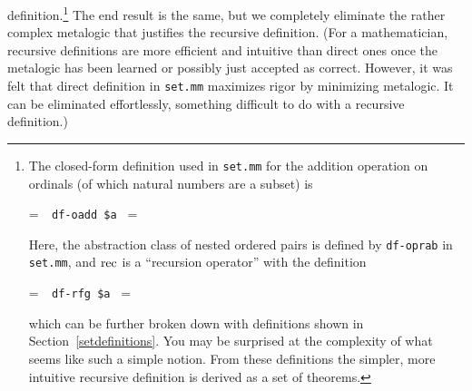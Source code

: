definition.\footnote{The closed-form definition used in \texttt{set.mm}
for the addition operation on ordinals (of which natural numbers are a
subset) is

\setbox\startprefix=\hbox{\tt \ \ df-oadd\ \$a\ }
\setbox\contprefix=\hbox{\tt \ \ \ \ \ \ \ \ \ \ \ \ \ }
\startm
\m{\vdash}\m{=}\m{\{}\m{\langle}\m{\langle}\m{,}\m{\rangle}%
\m{,}\m{\rangle}\m{|}\m{(}\m{(}\m{\in}\m{\wedge}\m{%
\in}\m{)}\m{\wedge}\m{=}\m{(}\m{(}\m{\{}\m{%
\langle}\m{,}\m{\rangle}\m{|}\m{=}\m{\}}\m{,}%
\m{)}\m{)}\m{)}\m{\}}
\endm

\noindent Here, the abstraction class of nested ordered pairs is defined by \texttt{df-oprab} in \texttt{set.mm},
and ${\rm rec}$ is a ``recursion operator'' with
the definition

\setbox\startprefix=\hbox{\tt \ \ df-rfg\ \$a\ }
\setbox\contprefix=\hbox{\tt \ \ \ \ \ \ \ \ \ \ \ \ }
\startm
\m{\vdash}\m{(}\m{,}\m{)}\m{=}\m{\bigcup}\m{\{}%
\m{|}\m{\exists}\m{(}\m{\in}\m{\wedge}\m{(}\m{\wedge}\m{\forall}\m{(}\m{\in}\m{\rightarrow}%
\m{(}\m{)}\m{=}\m{(}\m{\{}\m{\langle}\m{,}\m{\rangle}%
\m{|}\m{(}\m{(}\m{=}\m{\varnothing}\m{\wedge}\m{=}\m{)}\m{\vee}%
\m{(}\m{\lnot}\m{(}\m{=}\m{\varnothing}\m{\vee}%
\m{)}\m{\wedge}\m{=}\m{(}\m{(}\m{\bigcup}\m{)}\m{)}\m{)}\m{\vee}\m{(}\m{%
\wedge}\m{=}\m{\bigcup}\m{)}\m{)}\m{\}}\m{(}%
\m{\restriction}\m{)}\m{)}\m{)}\m{)}\m{)}\m{\}}
\endm

\noindent which can be further broken down with definitions shown in
Section~\ref{setdefinitions}.  You may be surprised at the complexity of what
seems like such a simple notion.  From these definitions the simpler, more
intuitive recursive definition is derived as a set of theorems.}
The end result is the same, but we completely eliminate the rather complex
metalogic that justifies the recursive definition.  (For a mathematician,
recursive definitions are more efficient and intuitive than
direct ones once the metalogic has been learned or possibly just accepted as
correct.  However, it was felt that direct definition in \texttt{set.mm}
maximizes rigor by minimizing metalogic.  It can be eliminated effortlessly,
something difficult to do with a recursive definition.)


